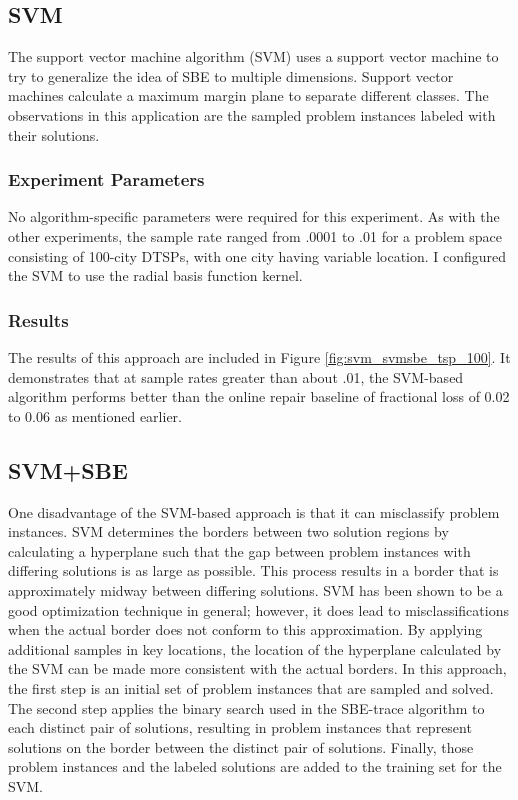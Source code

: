 \subsection{SVM} 

The support vector machine algorithm (SVM) uses a support vector machine to try to generalize the idea of SBE to multiple dimensions.  Support vector machines calculate a maximum margin plane to separate different classes.  The observations in this application are the sampled problem instances labeled with their solutions.  

\subsubsection{Experiment Parameters}

No algorithm-specific parameters were required for this experiment.  As with the other experiments, the sample rate ranged from .0001 to .01 for a problem space consisting of 100-city DTSPs, with one city having variable location.  I configured the SVM to use the radial basis function kernel.

\subsubsection{Results}  The results of this approach are included in Figure \ref{fig:svm_svmsbe_tsp_100}.  It demonstrates that at sample rates greater than about .01, the SVM-based algorithm performs better than the online repair baseline of fractional loss of 0.02 to 0.06 as mentioned earlier.

\subsection{SVM+SBE} 

One disadvantage of the SVM-based approach is that it can misclassify problem instances.  SVM determines the borders between two solution regions by calculating a hyperplane such that the gap between problem instances with differing solutions is as large as possible.  This process results in a border that is approximately midway between differing solutions.  SVM has been shown to be a good optimization technique in general; however, it does lead to misclassifications when the actual border does not conform to this approximation.  By applying additional samples in key locations, the location of the hyperplane calculated by the SVM can be made more consistent with the actual borders.  In this approach, the first step is an initial set of problem instances that are sampled and solved. The second step applies the binary search used in the SBE-trace algorithm to each distinct pair of solutions, resulting in problem instances that represent solutions on the border between the distinct pair of solutions.  Finally, those problem instances and the labeled solutions are added to the training set for the SVM. 

